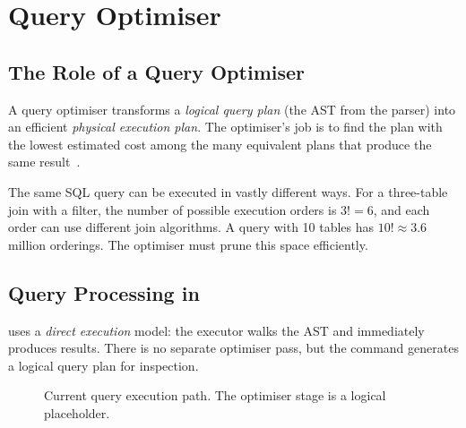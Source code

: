 \chapter{Query Optimiser}
\label{ch:query-optimizer}

\section{The Role of a Query Optimiser}

A query optimiser transforms a \emph{logical query plan} (the AST from the parser) into an efficient \emph{physical execution plan}.  The optimiser's job is to find the plan with the lowest estimated cost among the many equivalent plans that produce the same result~\cite{selinger1979access}.

\begin{conceptbox}
The same SQL query can be executed in vastly different ways.  For a three-table join with a filter, the number of possible execution orders is $3! = 6$, and each order can use different join algorithms.  A query with 10 tables has $10! \approx 3.6$ million orderings.  The optimiser must prune this space efficiently.
\end{conceptbox}

\section{Query Processing in \shiftdb{}}

\shiftdb{} uses a \emph{direct execution} model: the executor walks the AST and immediately produces results.  There is no separate optimiser pass, but the  command generates a logical query plan for inspection.

\begin{figure}[H]
\centering
{}
\caption{Current query execution path.  The optimiser stage is a logical placeholder.}
\label{fig:optimizer-path}
\end{figure}

